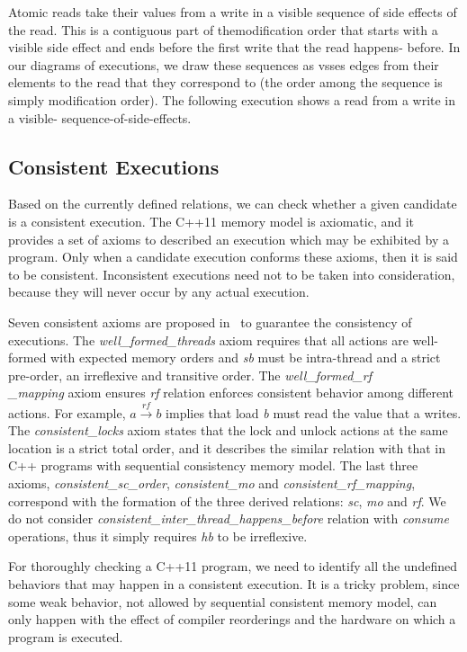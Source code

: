 \documentclass[preprint, numbers, 10pt]{sigplanconf}
\begin{document}
Atomic reads take their values from a write in a visible sequence of side effects of the read. This is a contiguous part of themodification order that starts with a visible side effect and ends before the first write that the read happens- before. In our diagrams of executions, we draw these sequences as vsses edges from their elements to the read that they correspond to (the order among the sequence is simply modification order). The following execution shows a read from a write in a visible- sequence-of-side-effects.


\subsection{Consistent Executions}
\label{sec:consistentExe}

Based on the currently defined relations, we can check whether a given 
candidate is a consistent execution. 
The C++11 memory model is axiomatic, and it provides a set of axioms 
to described an execution which may be exhibited by a program.
Only when a candidate execution conforms these axioms, then it is 
said to be consistent. Inconsistent executions need not to be taken into 
consideration, because they will never occur by any actual execution. 

Seven consistent axioms are proposed in~\citep{Batty:2011} to guarantee
the consistency of executions. 
The \textit{well\_formed\_threads} axiom requires that all actions are well-formed 
with expected memory orders and \textit{sb} must 
be intra-thread and a strict pre-order, an irreflexive and transitive order. 
The \textit{well\_formed\_rf\\\_mapping} axiom ensures \textit{rf} relation
enforces consistent behavior among different actions. For example, 
$a \stackrel{rf}{\longrightarrow} b$ implies that load \textit{b}
must read the value that a writes. 
The \textit{consistent\_locks} axiom states that the lock and unlock actions
at the same location is a strict total order, and it describes the similar
relation with that in C++ programs with sequential consistency memory model. 
The last three axioms, \textit{consistent\_sc\_order}, \textit{consistent\_mo} 
and \textit{consistent\_rf\_mapping}, correspond with the formation of the 
three derived relations: \textit{sc}, \textit{mo} and \textit{rf}. 
We do not consider \textit{consistent\_inter\_thread\_happens\_before}
relation with \textit{consume} operations, thus it simply requires \textit{hb} to 
be irreflexive. 

For thoroughly checking a C++11 program, we need to identify all the undefined
behaviors that may happen in a consistent execution. It is a tricky problem, since 
some weak behavior, not allowed by sequential consistent memory model,
can only happen with the effect of compiler reorderings and the hardware on 
which a program is executed. 
\end{document}
